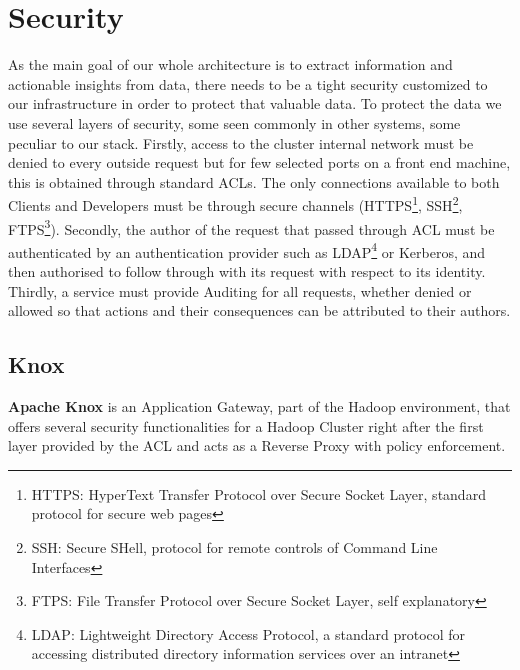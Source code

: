 \chapter{Security}

As the main goal of our whole architecture is to extract information and actionable insights from data, there needs to be a tight security customized to our infrastructure in order to protect that valuable data.
To protect the data we use several layers of security, some seen commonly in other systems, some peculiar to our stack.
\newline
Firstly, access to the cluster internal network must be denied to every outside request but for few selected ports on a front end machine, this is obtained through standard ACLs.
The only connections available to both Clients and Developers must be through secure channels (HTTPS\footnote{HTTPS: HyperText Transfer Protocol over Secure Socket Layer, standard protocol for secure web pages}, SSH\footnote{SSH: Secure SHell, protocol for remote controls of Command Line Interfaces}, FTPS\footnote{FTPS: File Transfer Protocol over Secure Socket Layer, self explanatory}).
\newline
Secondly, the author of the request that passed through ACL must be authenticated by an authentication provider such as LDAP\footnote{LDAP: Lightweight Directory Access Protocol, a standard protocol  for accessing distributed directory information services over an intranet} or Kerberos, and then authorised to follow through with its request with respect to its identity.
\newline
Thirdly, a service must provide Auditing for all requests, whether denied or allowed so that actions and their consequences can be attributed to their authors.

\pagebreak

\section{Knox}

\textbf{Apache Knox} \cite{knox_doc} is an Application Gateway, part of the Hadoop environment, that offers several security functionalities for a Hadoop Cluster right after the first layer provided by the ACL and acts as a Reverse Proxy with policy enforcement.
